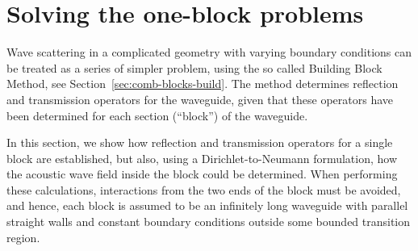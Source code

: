 \documentclass[a4paper,11pt]{article}
\renewcommand{\Re}{\operatorname{Re}}
\renewcommand{\i}{\,\mathrm{i}}
\begin{document}


\section{Solving the one-block problems}
\label{sec:oneblock}

Wave scattering in a complicated geometry with varying boundary
conditions can be treated as a series of simpler problem, using the so
called Building Block Method, see
Section~\ref{sec:comb-blocks-build}. The method determines reflection
and transmission operators for the waveguide, given that these
operators have been determined for each section (``block'') of the
waveguide. 

In this section, we show how reflection and transmission operators for
a single block are established, but also, using a Dirichlet-to-Neumann
formulation, how the acoustic wave field inside the block could be
determined.  When performing these calculations, interactions from the
two ends of the block must be avoided, and hence, each block is
assumed to be an infinitely long waveguide with parallel straight
walls and constant boundary conditions outside some bounded transition
region.
\end{document}
